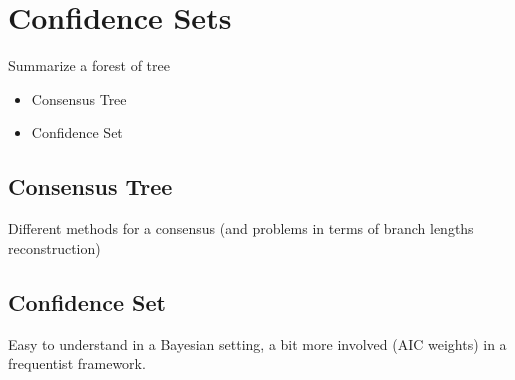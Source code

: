 \section{Confidence Sets} \label{sec:confidence}

Summarize a forest of tree
\begin{itemize}
 \item Consensus Tree
 \item Confidence Set
\end{itemize}

\subsection{Consensus Tree} \label{sec:consensus-tree}

Different methods for a consensus (and problems in terms of branch lengths reconstruction)

\subsection{Confidence Set} \label{sec:confidence-sets}

Easy to understand in a Bayesian setting, a bit more involved (AIC weights) in a frequentist framework. 
